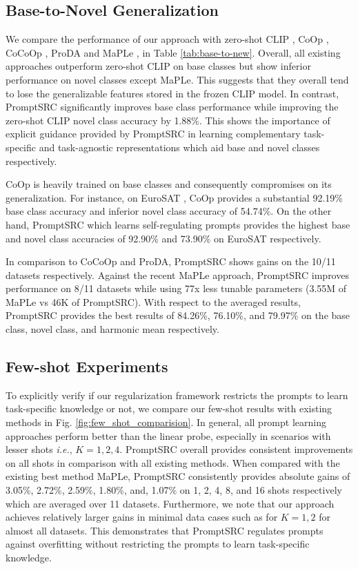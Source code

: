 \documentclass[10pt,twocolumn,letterpaper]{article}
\def\ie{\emph{i.e.}\xspace}
\begin{document}
\subsection{Base-to-Novel Generalization}
We compare the performance of our approach with zero-shot CLIP \cite{radford2021learning}, CoOp \cite{zhou2022learning}, CoCoOp \cite{zhou2022conditional}, ProDA \cite{lu2022prompt} and MaPLe \cite{khattak2023maple}, in Table \ref{tab:base-to-new}. Overall, all existing approaches outperform zero-shot CLIP on base classes but show inferior performance on novel classes {except MaPLe}. This suggests that they {overall} tend to lose the generalizable features stored in the frozen CLIP model. In contrast, PromptSRC significantly improves base class performance while improving the zero-shot CLIP novel class accuracy by 1.88\%. This shows the importance of explicit guidance provided by PromptSRC in learning complementary task-specific and task-agnostic representations which aid base and novel classes respectively.

CoOp is heavily trained on base classes and consequently compromises on its generalization. For instance, on EuroSAT \cite{helber2019eurosat}, CoOp provides a substantial 92.19\% base class accuracy and inferior novel class accuracy of 54.74\%. On the other hand, PromptSRC which learns self-regulating prompts provides the highest base and novel class accuracies of 92.90\% and 73.90\% on EuroSAT respectively.

In comparison to CoCoOp and ProDA, PromptSRC shows gains on the 10/11 datasets respectively. {Against the recent MaPLe approach, PromptSRC improves performance on 8/11 datasets while using 77x less tunable parameters (3.55M of MaPLe vs 46K of PromptSRC).} With respect to the averaged results, PromptSRC provides the best results of 84.26\%, 76.10\%, and 79.97\%  on the base class, novel class, and harmonic mean respectively. 

\subsection{Few-shot Experiments}
To explicitly verify if our regularization framework restricts the prompts to learn task-specific knowledge or not, we compare our few-shot results with existing methods in Fig. \ref{fig:few_shot_comparision}.
In general, all prompt learning approaches perform better than the linear probe, especially in scenarios with lesser shots \ie, $K=1, 2, 4$. PromptSRC overall provides consistent improvements on all shots in comparison with all existing methods. {When compared with the existing best method MaPLe, PromptSRC consistently provides absolute gains of 3.05\%, 2.72\%, 2.59\%,	1.80\%, and, 1.07\% on 1, 2, 4, 8, and 16 shots respectively which are averaged over 11 datasets.} 
Furthermore, we note that our approach achieves relatively larger gains in minimal data cases such as for $K=1, 2$ for almost all datasets. This demonstrates that PromptSRC regulates prompts against overfitting without restricting the prompts to learn task-specific knowledge. 
\end{document}
